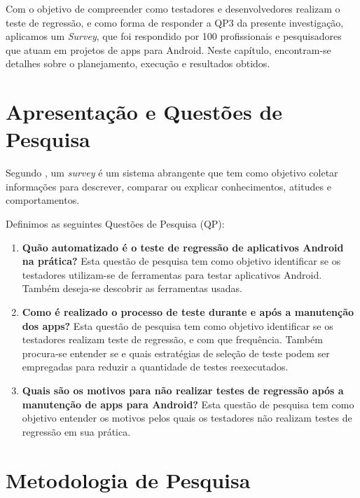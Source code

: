 
\acresetall 

Com o objetivo de compreender como testadores e desenvolvedores realizam o teste de regressão, e como forma de responder a QP3 da presente investigação, aplicamos um \textit{Survey}, que foi respondido por 100 profissionais e pesquisadores que atuam em projetos de apps para Android. Neste capítulo, encontram-se detalhes sobre o planejamento, execução e resultados obtidos.


\section{Apresentação e Questões de Pesquisa}\label{rqsurvey}

Segundo , um \textit{survey} é um sistema abrangente que tem como objetivo coletar informações para descrever, comparar ou explicar conhecimentos, atitudes e comportamentos.

Definimos as seguintes Questões de Pesquisa (QP):

\begin{enumerate}[label=\bf QP\arabic*,leftmargin=1.8cm]
    
    \item \textbf{Quão automatizado é o teste de regressão de aplicativos Android na prática?} Esta questão de pesquisa tem como objetivo identificar se os testadores utilizam-se de ferramentas para testar aplicativos Android. Também deseja-se descobrir as ferramentas usadas.
    
    \item \textbf{Como é realizado o processo de teste durante e após a manutenção dos apps?} Esta questão de pesquisa tem como objetivo identificar se os testadores realizam teste de regressão, e com que frequência. Também procura-se entender se e quais estratégias de seleção de teste podem ser empregadas para reduzir a quantidade de testes reexecutados.
    
    \item \textbf{Quais são os motivos para não realizar testes de regressão após a manutenção de apps para Android?} Esta questão de pesquisa tem como objetivo entender os motivos pelos quais os testadores não realizam testes de regressão em sua prática.
    
\end{enumerate}

\section{Metodologia de Pesquisa}\label{rmsurvey}

